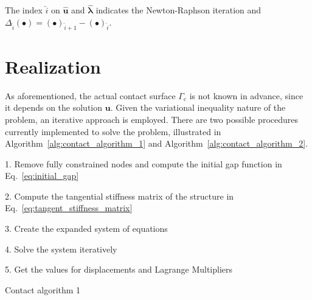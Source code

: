\documentclass[10pt,a4paper]{article}
\begin{document}
The index $\hat{i}$ on $\hat{\mathbf{u}}$ and $\hat{\boldsymbol{\lambda}}$ indicates the Newton-Raphson iteration and $\Delta_{\hat{i}} (\bullet) = (\bullet)_{\hat{i} + 1} - (\bullet)_{\hat{i}}$.

\section{Realization}

As aforementioned, the actual contact surface $\Gamma_{\text{c}}$ is not known in advance, since it depends on the solution $\mathbf{u}$. Given the variational inequality nature of the problem, an iterative approach is employed. There are two possible procedures currently implemented to solve the problem, illustrated in Algorithm~\ref{alg:contact_algorithm_1} and Algorithm~\ref{alg:contact_algorithm_2}. \\

\begin{algorithm}[ht]

	1. Remove fully constrained nodes and compute the initial gap function in Eq.~\eqref{eq:initial_gap} \; \vspace*{5pt}
	
    2. Compute the tangential stiffness matrix of the structure in Eq.~\eqref{eq:tangent_stiffness_matrix} \;	\vspace*{5pt}
    
    3. Create the expanded system of equations \;	\vspace*{5pt}
    
    4. Solve the system iteratively \;	\vspace*{5pt}

	\vspace*{5pt}
	5. Get the values for displacements and Lagrange Multipliers \; \vspace*{5pt}

	\caption{Contact algorithm 1}
	
	\label{alg:contact_algorithm_1}
\end{algorithm}
\end{document}
